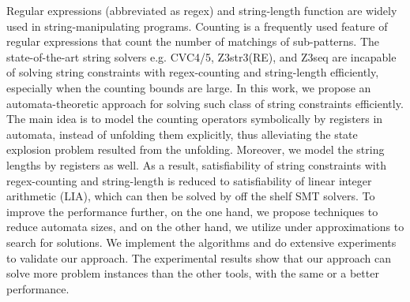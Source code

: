 
%

Regular expressions (abbreviated as regex) and string-length function are widely used in string-manipulating programs. 
Counting is a frequently used feature of regular expressions that count the number of matchings of sub-patterns. The state-of-the-art string solvers e.g. CVC4/5, Z3str3(RE), and Z3seq are incapable of solving string constraints with regex-counting and string-length efficiently, especially when the counting bounds are large. In this work, we propose an automata-theoretic approach for solving such class of string constraints efficiently. 
%
The main idea is to model the counting operators symbolically by registers in automata, instead of unfolding them explicitly, thus alleviating the state explosion problem resulted from the unfolding.  
%
Moreover, we model the string lengths by registers as well. 
As a result, satisfiability of string constraints with regex-counting and string-length is reduced to satisfiability of linear integer arithmetic (LIA), which can then be solved by off the shelf SMT solvers. 
%
%
To improve the performance further, on the one hand, we propose techniques to reduce automata sizes, 
and on the other hand, we utilize under approximations to search for solutions.   
We implement the algorithms and do extensive experiments to validate our approach. The experimental results show that 
our approach can solve more problem instances than the other tools, with the same or a better performance.



%